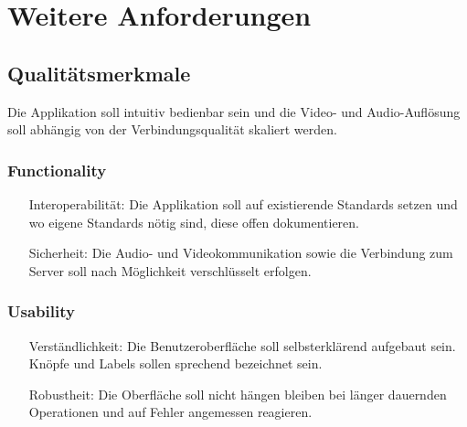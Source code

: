 \chapter{Weitere Anforderungen}

\section{Qualitätsmerkmale}
Die Applikation soll intuitiv bedienbar sein und die Video- und Audio-Auflösung
soll abhängig von der Verbindungsqualität skaliert werden.


\subsection{Functionality}
\begin{itemize}
	\item[Interoperabilität:] Die Applikation soll auf existierende Standards setzen und wo eigene Standards nötig sind, diese offen dokumentieren.
	\item[Sicherheit:] Die Audio- und Videokommunikation sowie die Verbindung zum Server soll nach Möglichkeit verschlüsselt erfolgen.
\end{itemize}


\subsection{Usability}
\begin{itemize}
	\item[Verständlichkeit:] Die Benutzeroberfläche soll selbsterklärend aufgebaut sein. Knöpfe und Labels sollen sprechend bezeichnet sein.
	\item[Robustheit:] Die Oberfläche soll nicht hängen bleiben bei länger dauernden Operationen und auf Fehler angemessen reagieren.
\end{itemize}

